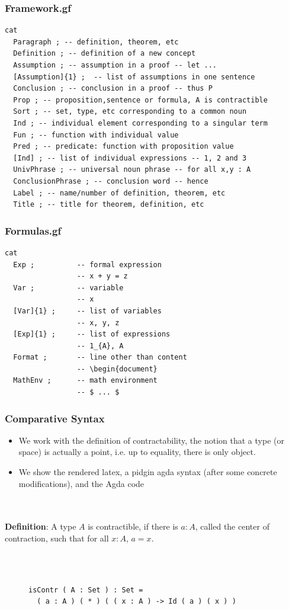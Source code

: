 \documentclass[10pt]{beamer}
\newcommand{\equalH}[2]{#1 = #2}
\begin{document}
\begin{frame}[fragile]
\frametitle{Framework.gf}
\begin{verbatim}
cat
  Paragraph ; -- definition, theorem, etc
  Definition ; -- definition of a new concept
  Assumption ; -- assumption in a proof -- let ...
  [Assumption]{1} ;  -- list of assumptions in one sentence
  Conclusion ; -- conclusion in a proof -- thus P
  Prop ; -- proposition,sentence or formula, A is contractible
  Sort ; -- set, type, etc corresponding to a common noun
  Ind ; -- individual element corresponding to a singular term
  Fun ; -- function with individual value
  Pred ; -- predicate: function with proposition value
  [Ind] ; -- list of individual expressions -- 1, 2 and 3
  UnivPhrase ; -- universal noun phrase -- for all x,y : A
  ConclusionPhrase ; -- conclusion word -- hence
  Label ; -- name/number of definition, theorem, etc
  Title ; -- title for theorem, definition, etc
\end{verbatim}
\end{frame}
\begin{frame}[fragile]

\frametitle{Formulas.gf}
\begin{verbatim}
cat
  Exp ;          -- formal expression             
                 -- x + y = z
  Var ;          -- variable
                 -- x
  [Var]{1} ;     -- list of variables             
                 -- x, y, z
  [Exp]{1} ;     -- list of expressions           
                 -- 1_{A}, A
  Format ;       -- line other than content       
                 -- \begin{document}
  MathEnv ;      -- math environment              
                 -- $ ... $
\end{verbatim}
\end{frame}

\begin{frame}[fragile]
\frametitle{Comparative Syntax}

\begin{itemize}
\item We work with the definition of contractability, the notion that a type (or space) is
actually a point, i.e. up to equality, there is only object. 
\item We show the rendered latex, a pidgin agda syntax (after some concrete
  modifications), and the Agda code
\end{itemize}\\~\\

\textbf{Definition}:
A type $A$ is contractible, if there is $a : A$, called the center of contraction, such that for all $x : A$, $\equalH {a}{x}$.

\\~\\
\begin{figure}
\begin{verbatim}
isContr ( A : Set ) : Set = 
  ( a : A ) ( * ) ( ( x : A ) -> Id ( a ) ( x ) )
\end{verbatim}
\end{figure}



\end{frame}
\end{document}
